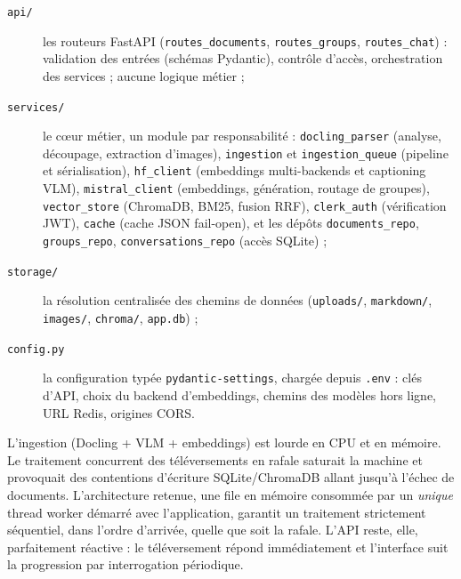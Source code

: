 \begin{description}
  \item[\texttt{api/}] les routeurs FastAPI (\texttt{routes\_documents},
    \texttt{routes\_groups}, \texttt{routes\_chat}) : validation des entrées (schémas
    Pydantic), contrôle d'accès, orchestration des services ; aucune logique métier ;
  \item[\texttt{services/}] le cœur métier, un module par responsabilité :
    \texttt{docling\_parser} (analyse, découpage, extraction d'images),
    \texttt{ingestion} et \texttt{ingestion\_queue} (pipeline et sérialisation),
    \texttt{hf\_client} (embeddings multi-backends et captioning VLM),
    \texttt{mistral\_client} (embeddings, génération, routage de groupes),
    \texttt{vector\_store} (ChromaDB, BM25, fusion RRF),
    \texttt{clerk\_auth} (vérification JWT),
    \texttt{cache} (cache JSON fail-open),
    et les dépôts \texttt{documents\_repo}, \texttt{groups\_repo},
    \texttt{conversations\_repo} (accès SQLite) ;
  \item[\texttt{storage/}] la résolution centralisée des chemins de données
    (\texttt{uploads/}, \texttt{markdown/}, \texttt{images/}, \texttt{chroma/},
    \texttt{app.db}) ;
  \item[\texttt{config.py}] la configuration typée \texttt{pydantic-settings}, chargée
    depuis \texttt{.env} : clés d'API, choix du backend d'embeddings, chemins des modèles
    hors ligne, URL Redis, origines CORS.
\end{description}


\begin{keybox}
L'ingestion (Docling + VLM + embeddings) est lourde en CPU et en mémoire. Le traitement
concurrent des téléversements en rafale saturait la machine et provoquait des contentions
d'écriture SQLite/ChromaDB allant jusqu'à l'échec de documents. L'architecture retenue,
une file en mémoire consommée par un \emph{unique} thread worker démarré avec
l'application, garantit un traitement strictement séquentiel, dans l'ordre d'arrivée,
quelle que soit la rafale. L'API reste, elle, parfaitement réactive : le téléversement
répond immédiatement et l'interface suit la progression par interrogation périodique.
\end{keybox}

